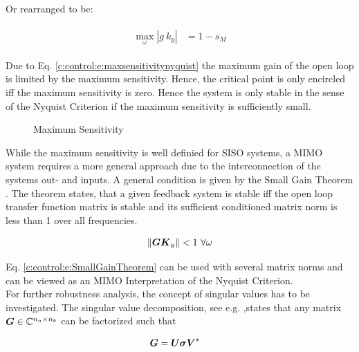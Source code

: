Or rearranged to be:

\begin{align}
\begin{split}
\max_\omega \left| g~k_y\right| &= 1 - s_M
\end{split}
\end{align}

Due to Eq. \ref{c:control:e:maxsensitivitynyquist} the maximum gain of the open loop is limited by the maximum sensitivity. Hence, the critical point is only encircled iff the maximum sensitivity is zero. Hence the system is only stable in the sense of the Nyquist Criterion if the maximum sensitivity is sufficiently small.\\

\begin{figure}[H]
\begin{minipage}[b]{\textwidth}
\centering

\caption{Maximum Sensitivity}
\label{c:control:f:MaximumSensitivity}
\end{minipage}
\end{figure}


While the maximum sensitivity is well definied for SISO systems, a MIMO system requires a more general approach due to the interconnection of the systems out- and inputs. A general condition is given by the Small Gain Theorem \cite[p.150 ff.]{Skogestad2005}. The theorem states, that a given feedback system is stable iff the open loop transfer function matrix is stable and its sufficient conditioned matrix norm is less than 1 over all frequencies.

\begin{align}
\lVert \mbox{\boldmath$G$} \mbox{\boldmath$K$}_y \rVert < 1 ~\forall \omega
\label{c:control:e:SmallGainTheorem}
\end{align}

Eq. \ref{c:control:e:SmallGainTheorem} can be used with several matrix norms and can be viewed as an MIMO Interpretation of the Nyquist Criterion. \\

For further robustness analysis, the concept of singular values has to be investigated. The singular value decomposition, see e.g. \cite[p.144 f.]{Zeidler2013},states that any matrix $\mbox{\boldmath$G$} \in \mathbb{C}^{n_a\times n_b}$ can be factorized such that

\begin{align}
\mbox{\boldmath$G$} &= \mbox{\boldmath$U$}\mbox{\boldmath$\sigma$}\mbox{\boldmath$V$}^*
\label{c:control:e:SVD}
\end{align}

